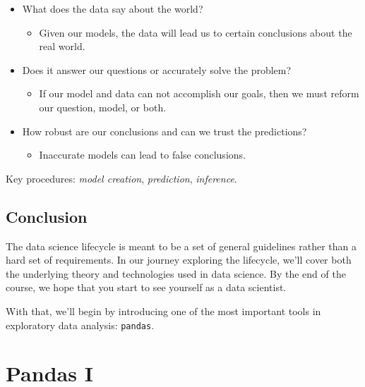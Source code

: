\documentclass[
  letterpaper,
  DIV=11,
  numbers=noendperiod]{scrreprt}
\providecommand{\tightlist}{%
  \setlength{\itemsep}{0pt}\setlength{\parskip}{0pt}}\usepackage{longtable,booktabs,array}
\begin{document}
\begin{itemize}
\tightlist
\item
  What does the data say about the world?

  \begin{itemize}
  \tightlist
  \item
    Given our models, the data will lead us to certain conclusions about
    the real world.\\
  \end{itemize}
\item
  Does it answer our questions or accurately solve the problem?

  \begin{itemize}
  \tightlist
  \item
    If our model and data can not accomplish our goals, then we must
    reform our question, model, or both.\\
  \end{itemize}
\item
  How robust are our conclusions and can we trust the predictions?

  \begin{itemize}
  \tightlist
  \item
    Inaccurate models can lead to false conclusions.
  \end{itemize}
\end{itemize}

Key procedures: \emph{model creation}, \emph{prediction},
\emph{inference}.

\section{Conclusion}\label{conclusion}

The data science lifecycle is meant to be a set of general guidelines
rather than a hard set of requirements. In our journey exploring the
lifecycle, we'll cover both the underlying theory and technologies used
in data science. By the end of the course, we hope that you start to see
yourself as a data scientist.

With that, we'll begin by introducing one of the most important tools in
exploratory data analysis: \texttt{pandas}.


\chapter{Pandas I}\label{pandas-i}
\end{document}
